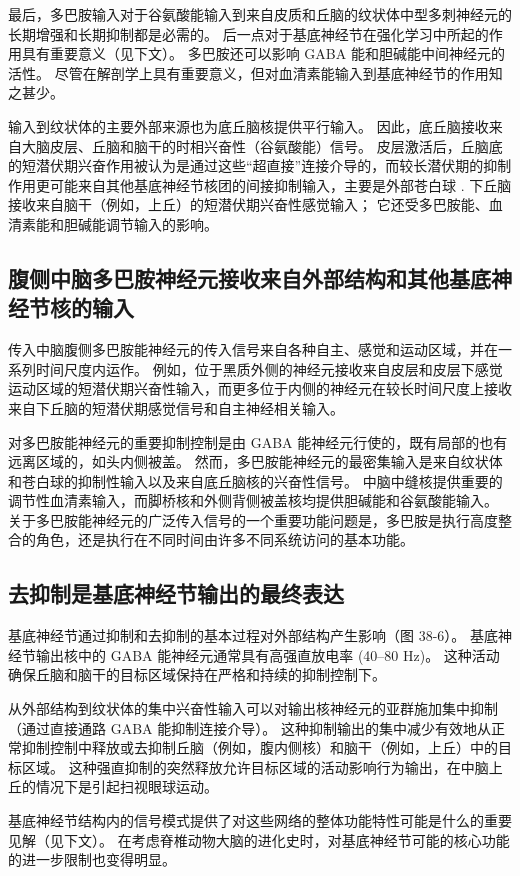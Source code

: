 最后，多巴胺输入对于谷氨酸能输入到来自皮质和丘脑的纹状体中型多刺神经元的长期增强和长期抑制都是必需的。 后一点对于基底神经节在强化学习中所起的作用具有重要意义（见下文）。 多巴胺还可以影响 GABA 能和胆碱能中间神经元的活性。 尽管在解剖学上具有重要意义，但对血清素能输入到基底神经节的作用知之甚少。

输入到纹状体的主要外部来源也为底丘脑核提供平行输入。 因此，底丘脑接收来自大脑皮层、丘脑和脑干的时相兴奋性（谷氨酸能）信号。 皮层激活后，丘脑底的短潜伏期兴奋作用被认为是通过这些“超直接”连接介导的，而较长潜伏期的抑制作用更可能来自其他基底神经节核团的间接抑制输入，主要是外部苍白球 . 下丘脑接收来自脑干（例如，上丘）的短潜伏期兴奋性感觉输入； 它还受多巴胺能、血清素能和胆碱能调节输入的影响。

\subsection{腹侧中脑多巴胺神经元接收来自外部结构和其他基底神经节核的输入}
传入中脑腹侧多巴胺能神经元的传入信号来自各种自主、感觉和运动区域，并在一系列时间尺度内运作。 例如，位于黑质外侧的神经元接收来自皮层和皮层下感觉运动区域的短潜伏期兴奋性输入，而更多位于内侧的神经元在较长时间尺度上接收来自下丘脑的短潜伏期感觉信号和自主神经相关输入。

对多巴胺能神经元的重要抑制控制是由 GABA 能神经元行使的，既有局部的也有远离区域的，如头内侧被盖。 然而，多巴胺能神经元的最密集输入是来自纹状体和苍白球的抑制性输入以及来自底丘脑核的兴奋性信号。 中脑中缝核提供重要的调节性血清素输入，而脚桥核和外侧背侧被盖核均提供胆碱能和谷氨酸能输入。 关于多巴胺能神经元的广泛传入信号的一个重要功能问题是，多巴胺是执行高度整合的角色，还是执行在不同时间由许多不同系统访问的基本功能。


\subsection{去抑制是基底神经节输出的最终表达}
基底神经节通过抑制和去抑制的基本过程对外部结构产生影响（图 38-6）。 基底神经节输出核中的 GABA 能神经元通常具有高强直放电率 (40–80 Hz)。 这种活动确保丘脑和脑干的目标区域保持在严格和持续的抑制控制下。

从外部结构到纹状体的集中兴奋性输入可以对输出核神经元的亚群施加集中抑制（通过直接通路 GABA 能抑制连接介导）。 这种抑制输出的集中减少有效地从正常抑制控制中释放或去抑制丘脑（例如，腹内侧核）和脑干（例如，上丘）中的目标区域。 这种强直抑制的突然释放允许目标区域的活动影响行为输出，在中脑上丘的情况下是引起扫视眼球运动。

基底神经节结构内的信号模式提供了对这些网络的整体功能特性可能是什么的重要见解（见下文）。 在考虑脊椎动物大脑的进化史时，对基底神经节可能的核心功能的进一步限制也变得明显。


